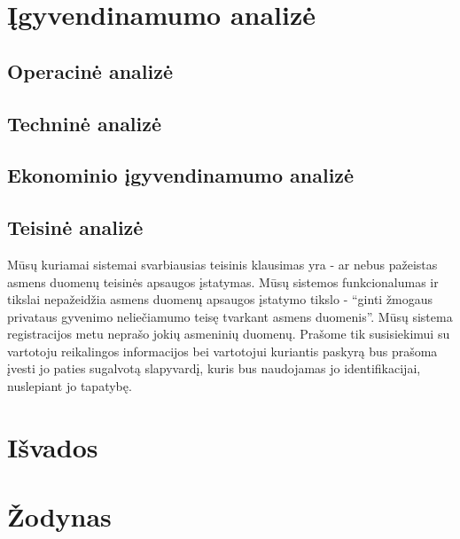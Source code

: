 \documentclass[oneside]{VUMIFPSkursinis}
\begin{document}
\section{Įgyvendinamumo analizė}
	\subsection{Operacinė analizė}
	\subsection{Techninė analizė}
	\subsection{Ekonominio įgyvendinamumo analizė}
	\subsection{Teisinė analizė}
Mūsų kuriamai sistemai svarbiausias teisinis klausimas yra - ar nebus pažeistas asmens duomenų teisinės apsaugos įstatymas. Mūsų sistemos funkcionalumas ir tikslai nepažeidžia asmens duomenų apsaugos įstatymo tikslo - “ginti žmogaus privataus gyvenimo neliečiamumo teisę tvarkant asmens duomenis”. Mūsų sistema registracijos metu neprašo jokių asmeninių duomenų. Prašome tik susisiekimui su vartotoju reikalingos informacijos bei vartotojui kuriantis paskyrą bus prašoma įvesti jo paties sugalvotą slapyvardį, kuris bus naudojamas jo identifikacijai, nuslepiant jo tapatybę.
\section{Išvados}
\section{Žodynas}
\end{document}
